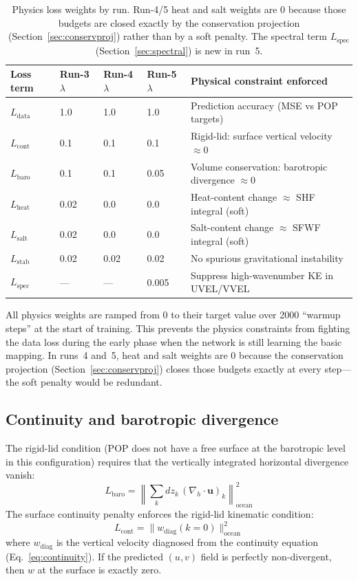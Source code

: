 \documentclass[11pt]{article}
\begin{document}
\begin{table}[h]
\centering
\caption{Physics loss weights by run. Run-4/5 heat and salt weights are 0 because
those budgets are closed exactly by the conservation projection
(Section~\ref{sec:conservproj}) rather than by a soft penalty.
The spectral term $L_\text{spec}$ (Section~\ref{sec:spectral}) is new in run~5.}
\label{tab:lossweights}
\begin{tabular}{lllll}
\toprule
Loss term & Run-3 $\lambda$ & Run-4 $\lambda$ & Run-5 $\lambda$ & Physical constraint enforced \\
\midrule
$L_\text{data}$ & 1.0  & 1.0  & 1.0   & Prediction accuracy (MSE vs POP targets) \\
$L_\text{cont}$ & 0.1  & 0.1  & 0.1   & Rigid-lid: surface vertical velocity $\approx0$ \\
$L_\text{baro}$ & 0.1  & 0.1  & 0.05  & Volume conservation: barotropic divergence $\approx0$ \\
$L_\text{heat}$ & 0.02 & 0.0  & 0.0   & Heat-content change $\approx$ SHF integral (soft) \\
$L_\text{salt}$ & 0.02 & 0.0  & 0.0   & Salt-content change $\approx$ SFWF integral (soft) \\
$L_\text{stab}$ & 0.02 & 0.02 & 0.02  & No spurious gravitational instability \\
$L_\text{spec}$ & ---  & ---  & 0.005 & Suppress high-wavenumber KE in UVEL/VVEL \\
\bottomrule
\end{tabular}
\end{table}

All physics weights are ramped from 0 to their target value over 2000 ``warmup
steps'' at the start of training. This prevents the physics constraints from
fighting the data loss during the early phase when the network is still learning
the basic mapping. In runs~4 and~5, heat and salt weights are 0 because the
conservation projection (Section~\ref{sec:conservproj}) closes those budgets
exactly at every step---the soft penalty would be redundant.

\subsection{Continuity and barotropic divergence}
The rigid-lid condition (POP does not have a free surface at the barotropic
level in this configuration) requires that the vertically integrated horizontal
divergence vanish:
\begin{equation}
L_\text{baro} = \left\|\sum_k dz_k\,(\nabla_h\cdot\mathbf{u})_k\right\|^2_\text{ocean}
\end{equation}
The surface continuity penalty enforces the rigid-lid kinematic condition:
\begin{equation}
L_\text{cont} = \|w_\text{diag}(k=0)\|^2_\text{ocean}
\end{equation}
where $w_\text{diag}$ is the vertical velocity diagnosed from the
continuity equation (Eq.~\ref{eq:continuity}). If the predicted $(u,v)$
field is perfectly non-divergent, then $w$ at the surface is exactly zero.
\end{document}
